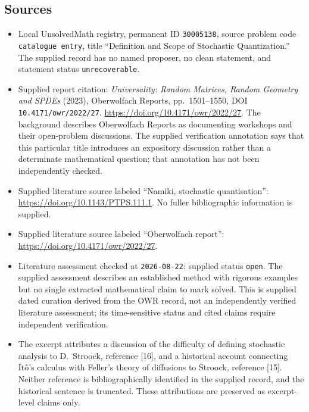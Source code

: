 \documentclass[11pt]{article}
\begin{document}
\subsection{Sources}
\begin{itemize}
\item Local UnsolvedMath registry, permanent ID \texttt{30005138}, source problem code \texttt{catalogue entry}, title ``Definition and Scope of Stochastic Quantization.'' The supplied record has no named proposer, no clean statement, and statement status \texttt{unrecoverable}.
\item Supplied report citation: \emph{Universality: Random Matrices, Random Geometry and SPDEs} (2023), Oberwolfach Reports, pp.\ 1501--1550, DOI \texttt{10.4171/owr/2022/27}. \url{https://doi.org/10.4171/owr/2022/27}. The background describes Oberwolfach Reports as documenting workshops and their open-problem discussions. The supplied verification annotation says that this particular title introduces an expository discussion rather than a determinate mathematical question; that annotation has not been independently checked.
\item Supplied literature source labeled ``Namiki, stochastic quantisation'': \url{https://doi.org/10.1143/PTPS.111.1}. No fuller bibliographic information is supplied.
\item Supplied literature source labeled ``Oberwolfach report'': \url{https://doi.org/10.4171/owr/2022/27}.
\item Literature assessment checked at \texttt{2026-08-22}: supplied status \texttt{open}. The supplied assessment describes an established method with rigorous examples but no single extracted mathematical claim to mark solved. This is supplied dated curation derived from the OWR record, not an independently verified literature assessment; its time-sensitive status and cited claims require independent verification.
\item The excerpt attributes a discussion of the difficulty of defining stochastic analysis to D.\ Stroock, reference [16], and a historical account connecting It\^o's calculus with Feller's theory of diffusions to Stroock, reference [15]. Neither reference is bibliographically identified in the supplied record, and the historical sentence is truncated. These attributions are preserved as excerpt-level claims only.
\end{itemize}
\end{document}
